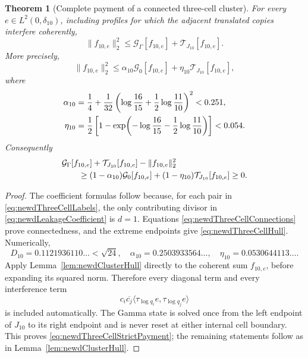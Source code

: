 \documentclass[11pt]{amsart}
\newtheorem{theorem}{Theorem}[section]
\theoremstyle{definition}
\theoremstyle{remark}
\begin{document}
\begin{theorem}[Complete payment of a connected three-cell cluster]
\label{thm:newdThreeCellCluster}
For every $e\in L^2(0,\delta_{10})$, including profiles for which the
adjacent translated copies interfere coherently,
\begin{equation}\label{eq:newdThreeCellPayment}
 \|f_{10,e}\|_2^2
 \leq\mathcal G_\Gamma[f_{10,e}]
      +\mathcal T_{J_{10}}[f_{10,e}].
\end{equation}
More precisely,
\begin{equation}\label{eq:newdThreeCellStrictPayment}
 \|f_{10,e}\|_2^2
 \leq\alpha_{10}\mathcal G_0[f_{10,e}]
      +\eta_{10}\mathcal T_{J_{10}}[f_{10,e}],
\end{equation}
where
\begin{align}
 \alpha_{10}
 &=\frac14+\frac1{32}
   \left(\log\frac{16}{15}
        +\frac12\log\frac{11}{10}\right)^2
   <0.251,\notag\\
 \eta_{10}
 &=\frac12\left[1-
   \exp\!\left(-\log\frac{16}{15}
               -\frac12\log\frac{11}{10}\right)\right]
   <0.054.
 \label{eq:newdThreeCellConstants}
\end{align}
Consequently
\begin{align}
 &\mathcal G_\Gamma[f_{10,e}]
  +\mathcal T_{J_{10}}[f_{10,e}]-\|f_{10,e}\|_2^2
 \notag\\
 &\qquad\geq
 (1-\alpha_{10})\mathcal G_0[f_{10,e}]
 +(1-\eta_{10})\mathcal T_{J_{10}}[f_{10,e}]\geq0.
 \label{eq:newdThreeCellRemainder}
\end{align}
\end{theorem}

\begin{proof}
The coefficient formulas follow because, for each pair in
\eqref{eq:newdThreeCellLabels}, the only contributing divisor in
\eqref{eq:newdLeakageCoefficient} is $d=1$.  Equations
\eqref{eq:newdThreeCellConnections} prove connectedness, and the extreme
endpoints give \eqref{eq:newdThreeCellHull}.  Numerically,
\[
 D_{10}=0.1121936110\ldots<\sqrt{24},
 \quad
 \alpha_{10}=0.2503933564\ldots,
 \quad
 \eta_{10}=0.0530644113\ldots.
\]
Apply Lemma~\ref{lem:newdClusterHull} directly to the coherent sum
$f_{10,e}$, before expanding its squared norm.  Therefore every diagonal
term and every interference term
\[
 c_i\overline{c_j}
 \langle\tau_{\log q_i}e,\tau_{\log q_j}e\rangle
\]
is included automatically.  The Gamma state is solved once from the left
endpoint of $J_{10}$ to its right endpoint and is never reset at either
internal cell boundary.  This proves
\eqref{eq:newdThreeCellStrictPayment}; the remaining statements follow as
in Lemma~\ref{lem:newdClusterHull}.
\end{proof}
\end{document}
